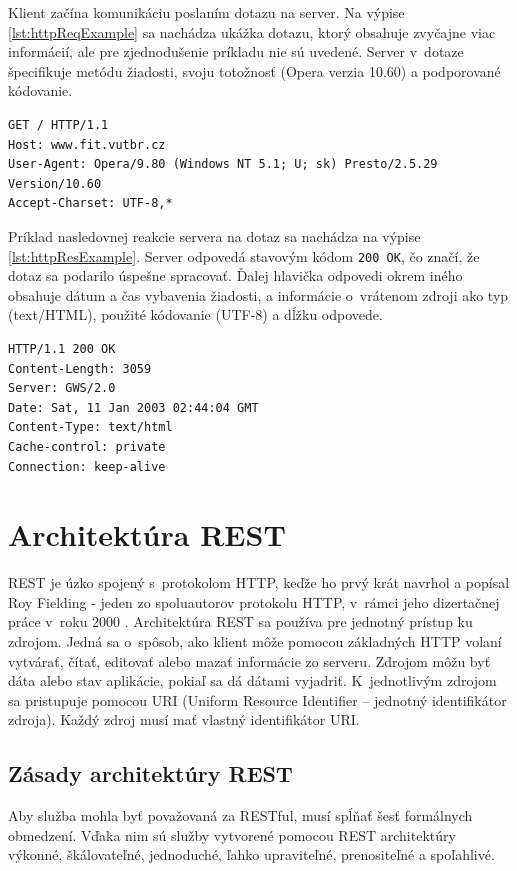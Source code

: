 \documentclass[slovak,cprint]{fitthesis} %
\begin{document}
Klient začína komunikáciu poslaním dotazu na server. Na výpise \ref{lst:httpReqExample} sa nachádza ukážka dotazu, ktorý obsahuje zvyčajne viac informácií, ale pre zjednodušenie príkladu nie sú uvedené. Server v~dotaze špecifikuje metódu žiadosti, svoju totožnosť (Opera verzia 10.60) a podporované kódovanie.
\begin{lstlisting}[caption=príklad HTTP dotazu,frame=tlrb,label={lst:httpReqExample}]
GET / HTTP/1.1
Host: www.fit.vutbr.cz
User-Agent: Opera/9.80 (Windows NT 5.1; U; sk) Presto/2.5.29 Version/10.60
Accept-Charset: UTF-8,*
\end{lstlisting}
Príklad nasledovnej reakcie servera na dotaz sa nachádza na výpise \ref{lst:httpResExample}. Server odpovedá stavovým kódom \texttt{200 OK}, čo značí, že dotaz sa podarilo úspešne spracovať. Ďalej hlavička odpovedi okrem iného obsahuje dátum a čas vybavenia žiadosti, a informácie o~vrátenom zdroji ako typ (text/HTML), použité kódovanie (UTF-8) a dĺžku odpovede. 
\begin{lstlisting}[caption=príklad HTTP odpovedi,frame=tlrb,label={lst:httpResExample}]
HTTP/1.1 200 OK
Content-Length: 3059
Server: GWS/2.0
Date: Sat, 11 Jan 2003 02:44:04 GMT
Content-Type: text/html
Cache-control: private
Connection: keep-alive
\end{lstlisting}



\section{Architektúra REST}\label{rest}
REST je úzko spojený s~protokolom HTTP, keďže ho prvý krát navrhol a popísal Roy Fielding - jeden zo spoluautorov protokolu HTTP, v~rámci jeho dizertačnej práce v~roku 2000 \cite{dizertackaREST}.
Architektúra REST sa používa pre jednotný prístup ku zdrojom. Jedná sa o~spôsob, ako klient môže pomocou základných HTTP volaní vytvárať, čítať, editovať alebo mazať informácie zo serveru. Zdrojom môžu byť dáta alebo stav aplikácie, pokiaľ sa dá dátami vyjadriť. K~jednotlivým zdrojom sa pristupuje pomocou URI (Uniform Resource Identifier – jednotný identifikátor zdroja). Každý zdroj musí mať vlastný identifikátor URI.

\label{zasadyREST}
\subsection{Zásady architektúry REST}
Aby služba mohla byť považovaná za RESTful, musí spĺňať šesť formálnych obmedzení. Vďaka nim sú služby vytvorené pomocou REST architektúry výkonné, škálovateľné, jednoduché, ľahko upraviteľné, prenositeľné a spoľahlivé.
\end{document}

